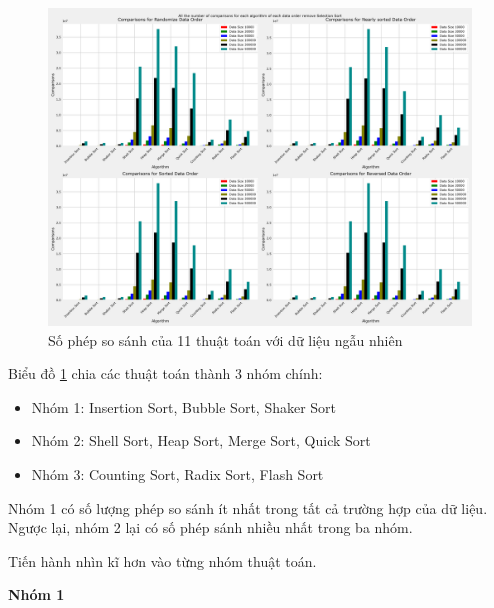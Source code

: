 \begin{figure}[H]
    \centering
    \includegraphics[width=\textwidth]{exprimental_result/images/all_the_number_of_comparisons_for_each_algorithm_of_each_data_order_remove_selection_sort.png}
    \caption{Số phép so sánh của 11 thuật toán với dữ liệu ngẫu nhiên}
    \label{fig:all_the_number_of_comparisons_for_each_algorithm_of_each_data_order_remove_selection_sort}
\end{figure}


Biểu đồ \ref{fig:all_the_number_of_comparisons_for_each_algorithm_of_each_data_order_remove_selection_sort} chia các thuật toán thành 3 nhóm chính: 
\begin{itemize}
    \item Nhóm 1: Insertion Sort, Bubble Sort, Shaker Sort 
    \item Nhóm 2: Shell Sort, Heap Sort, Merge Sort, Quick Sort
    \item Nhóm 3: Counting Sort, Radix Sort, Flash Sort
\end{itemize}

Nhóm 1 có số lượng phép so sánh ít nhất trong tất cả trường hợp của dữ liệu. Ngược lại, nhóm 2 lại có số phép sánh nhiều nhất trong ba nhóm.

Tiến hành nhìn kĩ hơn vào từng nhóm thuật toán.

\textbf{Nhóm 1}

